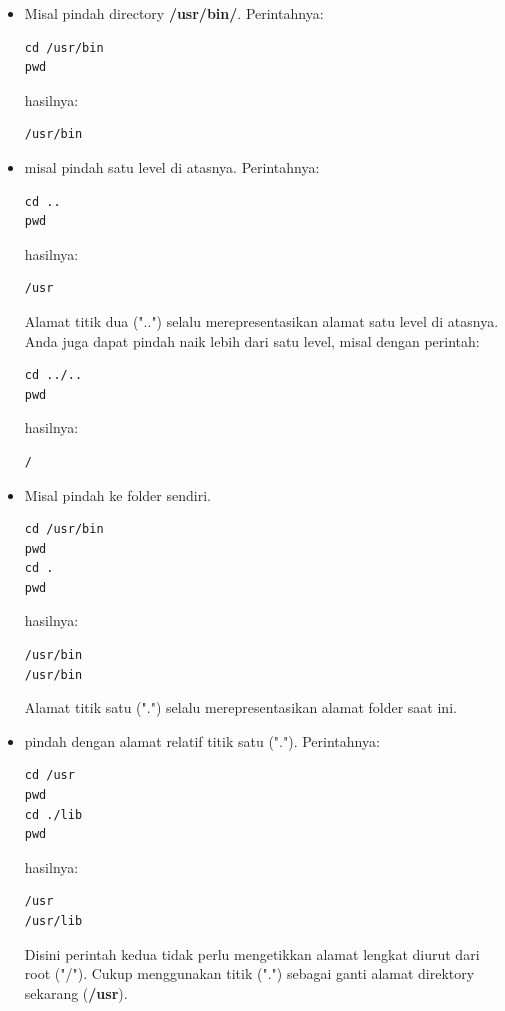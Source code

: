 \documentclass[12pt,]{article}
\begin{document}
\begin{itemize}
\begin{itemize}
			\item Misal pindah directory \textbf{/usr/bin/}.
			Perintahnya:
			\begin{verbatim}
cd /usr/bin
pwd
			\end{verbatim}
			hasilnya:
			\begin{verbatim}
/usr/bin
			\end{verbatim}

			\item misal pindah satu level di atasnya.
			Perintahnya:
			\begin{verbatim}
cd ..
pwd
			\end{verbatim}
			hasilnya:
			\begin{verbatim}
/usr
			\end{verbatim}
			Alamat titik dua ("..")	selalu merepresentasikan alamat	satu level di atasnya.
			Anda juga dapat pindah naik lebih dari satu level, misal dengan perintah:
			\begin{verbatim}
cd ../..
pwd
			\end{verbatim}
			hasilnya:
			\begin{verbatim}
/
			\end{verbatim}

			\item Misal pindah ke folder sendiri.
			\begin{verbatim}
cd /usr/bin
pwd
cd .
pwd
			\end{verbatim}
			hasilnya:
			\begin{verbatim}
/usr/bin
/usr/bin
			\end{verbatim}
			Alamat titik satu (".") selalu merepresentasikan alamat	folder saat ini.

			\item pindah dengan alamat relatif titik satu (".").
			Perintahnya:
			\begin{verbatim}
cd /usr
pwd
cd ./lib
pwd
			\end{verbatim}
			hasilnya:
			\begin{verbatim}
/usr
/usr/lib
			\end{verbatim}
			Disini perintah kedua tidak perlu mengetikkan alamat lengkat diurut dari root ("/").
			Cukup menggunakan titik (".") sebagai ganti alamat direktory sekarang (\textbf{/usr}).


\end{itemize}
\end{itemize}
\end{document}

